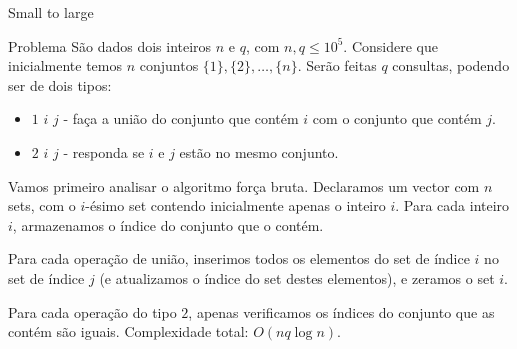 \begin{frame}{Small to large}

    \footnotesize 

    \begin{block}{Problema}
        São dados dois inteiros $n$ e $q$, com $n, q \leq 10^5$. Considere que inicialmente temos $n$ conjuntos $\{1\}, \{2\}, \dots, \{n\}$. Serão feitas $q$ consultas, podendo ser de dois tipos:
        \begin{itemize}
            \item $1$ $i$ $j$ - faça a união do conjunto que contém $i$ com o conjunto que contém $j$.
            \item $2$ $i$ $j$ - responda se $i$ e $j$ estão no mesmo conjunto. 
        \end{itemize}
    \end{block}

    Vamos primeiro analisar o algoritmo força bruta. Declaramos um vector com $n$ sets, com o $i$-ésimo set contendo inicialmente apenas o inteiro $i$. Para cada inteiro $i$, armazenamos o índice do conjunto que o contém.

    Para cada operação de união, inserimos todos os elementos do set de índice $i$ no set de índice $j$ (e atualizamos o índice do set destes elementos), e zeramos o set $i$.

    Para cada operação do tipo $2$, apenas verificamos os índices do conjunto que as contém são iguais. Complexidade total: $O(nq \log n)$.


\end{frame}
